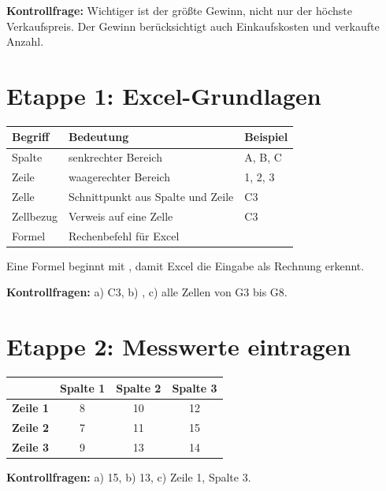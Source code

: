 \textbf{Kontrollfrage:} Wichtiger ist der größte Gewinn, nicht nur der höchste Verkaufspreis. Der Gewinn berücksichtigt auch Einkaufskosten und verkaufte Anzahl.

\section*{Etappe 1: Excel-Grundlagen}
\begin{tabularx}{\textwidth}{|L{3.1cm}|Y|L{3.5cm}|}
\hline
{}\textbf{Begriff} & \textbf{Bedeutung} & \textbf{Beispiel}\\\hline
Spalte & senkrechter Bereich & A, B, C\\\hline
Zeile & waagerechter Bereich & 1, 2, 3\\\hline
Zelle & Schnittpunkt aus Spalte und Zeile & C3\\\hline
Zellbezug & Verweis auf eine Zelle & C3\\\hline
Formel & Rechenbefehl für Excel & \\\hline
\end{tabularx}

Eine Formel beginnt mit \code{=}, damit Excel die Eingabe als Rechnung erkennt.

\textbf{Kontrollfragen:} a) C3, b) \code{*}, c) alle Zellen von G3 bis G8.

\section*{Etappe 2: Messwerte eintragen}
\begin{center}
\begin{tabular}{|c|c|c|c|}
\hline
 & \textbf{Spalte 1} & \textbf{Spalte 2} & \textbf{Spalte 3}\\\hline
\textbf{Zeile 1} & 8 & 10 & 12\\\hline
\textbf{Zeile 2} & 7 & 11 & 15\\\hline
\textbf{Zeile 3} & 9 & 13 & 14\\\hline
\end{tabular}
\end{center}
\textbf{Kontrollfragen:} a) 15, b) 13, c) Zeile 1, Spalte 3.

